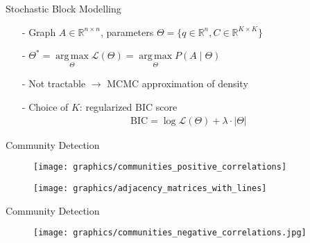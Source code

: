 \documentclass[xcolor=dvipsnames, aspectratio=169]{beamer}
\DeclareMathOperator*{\argmax}{arg\,max}
\begin{document}
    \begin{frame}{Stochastic Block Modelling}
        \begin{itemize}
            \item[-] Graph $A \in \mathbb{R}^{n\times n}$, parameters $\Theta = \{q \in \mathbb{R}^n, C \in \mathbb{R}^{K\times K} \}$ \pause
            \item[-]  $\Theta^* = \argmax\limits_\Theta \mathcal{L}(\Theta) = \argmax\limits_\Theta P(A\mid \Theta)$ \pause
            \item[-] Not tractable $\rightarrow$ MCMC approximation of density \pause
            \item[-] Choice of $K$: regularized BIC score 
            \begin{align*}
                \text{BIC} = \log\mathcal{L}(\Theta) + \lambda \cdot |\Theta|
            \end{align*}
        \end{itemize}
    \end{frame}
    
    \begin{comment}
        - communities positive correlations
    \end{comment}
   
    \begin{frame}{Community Detection}
    
        \hspace{.4cm}
        \begin{minipage}{.55\paperwidth}
            \begin{figure}
                \centering
                \texttt{[image: graphics/communities\_positive\_correlations]}
            \end{figure}
        \end{minipage}
        \hspace{.3cm}
        \begin{minipage}{.3\paperwidth}
            \begin{figure}
                \centering
                \texttt{[image: graphics/adjacency\_matrices\_with\_lines]}
            \end{figure}
        \end{minipage}
        
    \end{frame}
    
    \begin{comment}
        - communities negative correlations
    \end{comment}
    \begin{frame}{Community Detection}
    \begin{figure}
        \centering
        \texttt{[image: graphics/communities\_negative\_correlations.jpg]}
    \end{figure}
    \end{frame}
    
\end{document}
